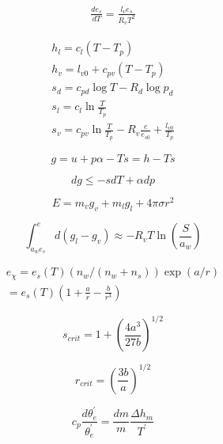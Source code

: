 \documentclass[12pt]{article}
\begin{document}
\begin{multicols}{2}
\begin{gather}
  \frac{de_s }{dT} = \frac{l_v e_s}{R_v T^2} 
\end{gather}


\begin{subequations}
  \begin{eqnarray}
  h_l = c_l (T - T_p) \\
 h_v = l_{v0} + c_{pv} ( T - T_p) \\
s_d = c_{pd} \log T - R_d \log p_d\\
 s_l = c_l \ln \frac{T }{T_p}  \\
 s_v = c_{pv} \ln \frac{T }{T_p} - R_v \frac{e }{e_{s0}} + \frac{l_{v0} }{T_p}  
\label{eq:sref}
  \end{eqnarray}
\end{subequations}


  \begin{equation}
  g = u + p\alpha - Ts = h - Ts
  \end{equation}

  \begin{equation}
    \label{eq:dg}
    dg \leq -s dT + \alpha dp
  \end{equation}


  \begin{equation}
    \label{eq:G}
    E = m_v g_v + m_l g_l + 4 \pi \sigma r^2
  \end{equation}

  \begin{equation}
    \label{eq:newint}
    \int_{a_w e_s}^e  d(g_l - g_v) \approx  - R_v T\ln \left (
      \frac{S}{a_w} \right )
  \end{equation}



\begin{multline}
  \label{equil}
  e_{\chi} = e_s(T)(n_w/(n_w + n_s))\exp(a/r) \\
  = e_s(T)(1 + \frac{a}{r} - \frac{b}{r^3})
\end{multline}

\begin{equation}
  \label{eq:sscrit}
  s_{crit}= 1 + \left ( \frac{4 a^3}{27 b} \right )^{1/2}
\end{equation}

\begin{equation}
  \label{eq:rcrit}
  r_{crit} = \left ( \frac{3b}{a} \right )^{1/2}
\end{equation}

\begin{equation}
  \label{eq:2ndb}
  c_p \frac{d\theta_e^\prime}{\theta_e^\prime} = 
          \frac{dm}{m} \frac{\Delta h_m}{T^\prime}
\end{equation}


\end{multicols}
\end{document}
